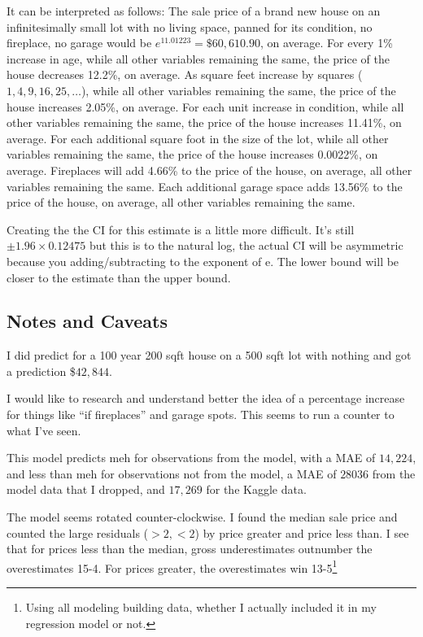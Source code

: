 \documentclass[twocolumn,11pt]{article}
\begin{document}
It can be interpreted as follows:
The sale price of a brand new house on an infinitesimally small lot with no living space,
panned for its condition, no fireplace, no garage would be $e^{11.01223}=\$60,610.90$, on average.
For every 1\% increase in age, while all other variables remaining the same, the price of the house decreases 12.2\%, on average.
As square feet increase by squares (${1,4,9,16,25,\ldots}$), while all other variables remaining the same, the price of the house increases 2.05\%, on average.
For each unit increase in condition, while all other variables remaining the same, the price of the house increases 11.41\%, on average.
For each additional square foot in the size of the lot, while all other variables remaining the same, the price of the house increases 0.0022\%, on average.
Fireplaces will add 4.66\% to the price of the house, on average, all other variables remaining the same.
Each additional garage space adds 13.56\% to the price of the house, on average, all other variables remaining the same.

Creating the the CI for this estimate is a little more difficult.
It's still $\pm 1.96 \times 0.12475$ but this is to the natural log,
the actual CI will be asymmetric because you adding/subtracting to the exponent of e.
The lower bound will be closer to the estimate than the upper bound.


\subsection*{Notes and Caveats}
I did predict for a 100 year 200 sqft house on a 500 sqft lot with nothing and got a prediction \$$42,844$.

I would like to research and understand better the idea of a percentage increase for things like ``if fireplaces'' and garage spots. This seems to run a counter to what I've seen.

This model predicts meh for observations from the model, with a MAE of $14,224$,
and less than meh for observations not from the model, a MAE of $28036$ from the model data that I dropped, 
and $17,269$ for the Kaggle data.

The model seems rotated counter-clockwise.
I found the median sale price and counted the large residuals ($>2, <2$)
by price greater and price less than.
I see that for prices less than the median,
gross underestimates outnumber the overestimates 15-4.
For prices greater, the overestimates win 13-5\footnote{Using all modeling building data,
whether I actually included it in my regression model or not.}
\end{document}
